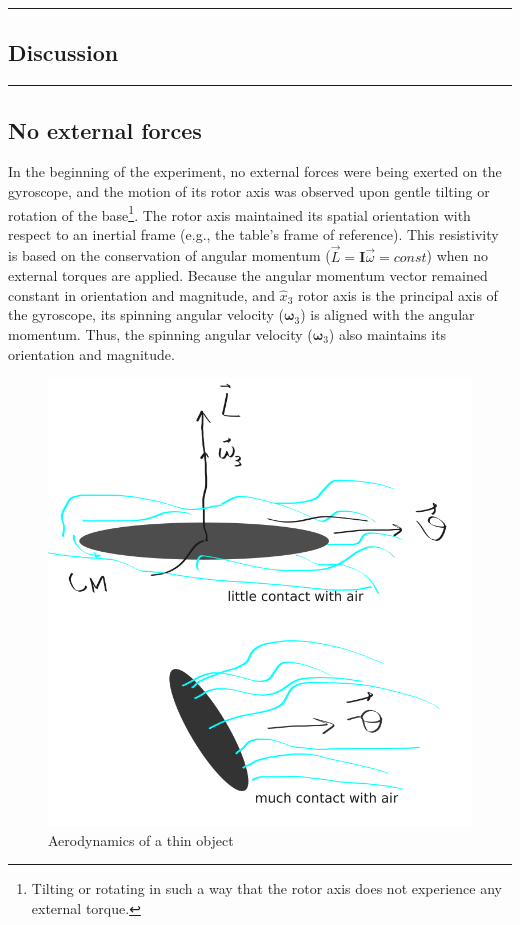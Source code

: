 {\color{gray}\hrule}
\begin{center}
\section{Discussion} \label{sec:discussion}
\bigskip
\end{center}
{\color{gray}\hrule}

\begin{multicols}{2}
\subsection{No external forces}
\label{sec:discussion:no}

In the beginning of the experiment, no external forces were being exerted on the gyroscope, and the motion of its rotor axis was observed upon gentle tilting or rotation of the base\footnote{Tilting or rotating in such a way that the rotor axis does not experience any external torque.}. The rotor axis maintained its spatial orientation with respect to an inertial frame (e.g., the table's frame of reference). This resistivity is based on the conservation of angular momentum ($\vec{L} = \mathbf{I}\vec{\omega} = const$) when no external torques are applied. Because the angular momentum vector remained constant in orientation and magnitude, and $\hat{x}_{3}$ rotor axis is the principal axis of the gyroscope, its spinning angular velocity ($\boldsymbol\omega_{3}$) is aligned with the angular momentum. Thus, the spinning angular velocity ($\boldsymbol\omega_{3}$) also maintains its orientation and magnitude.

\begin{figure}[H]
  \centering
  \includegraphics[width=0.7\columnwidth]{gyroscope/images/thin}
  \caption{Aerodynamics of a thin object }
  \label{fig:discussion:thin}
\end{figure}


\end{multicols}
